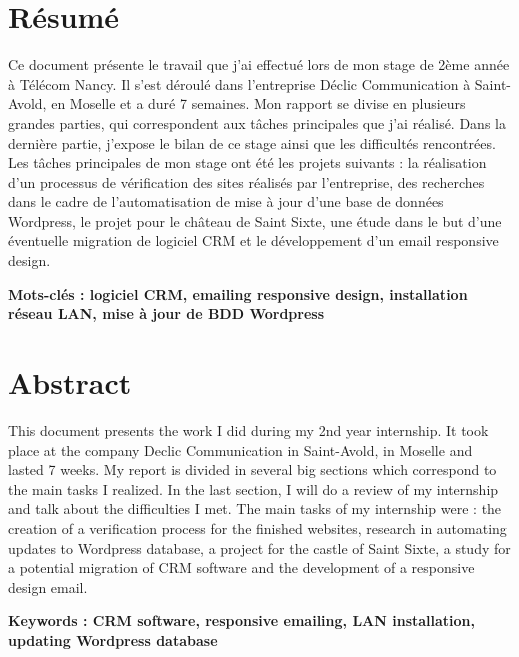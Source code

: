 \documentclass[report]{tnreport}
\begin{document}
\cleardoublepage
\thispagestyle{empty}

\section*{Résumé}
Ce document présente le travail que j’ai effectué lors de mon stage de 2ème année à Télécom Nancy. Il s’est déroulé dans l’entreprise Déclic Communication à Saint-Avold, en Moselle et a duré 7 semaines. Mon rapport se divise en plusieurs grandes parties, qui correspondent aux tâches principales que j’ai réalisé. Dans la dernière partie, j’expose le bilan de ce stage ainsi que les difficultés rencontrées.
Les tâches principales de mon stage ont été les projets suivants : la réalisation d’un processus de vérification des sites réalisés par l’entreprise, des recherches dans le cadre de l’automatisation de mise à jour d’une base de données Wordpress, le projet pour le château de Saint Sixte, une étude dans le but d’une éventuelle migration de logiciel CRM et le développement d’un email responsive design.


{\bf Mots-clés : logiciel CRM, emailing responsive design, installation réseau LAN, mise à jour de BDD Wordpress}


\section*{Abstract}
This document presents the work I did during my 2nd year internship. It took place at the company Declic Communication in Saint-Avold, in Moselle and lasted 7 weeks. My report is divided in several big sections which correspond to the main tasks I realized. In the last section, I will do a review of my internship and talk about the difficulties I met. The main tasks of my internship were : the creation of a verification process for the finished websites, research in automating updates to Wordpress database, a project for the castle of Saint Sixte, a study for a potential migration of CRM software and the development of a responsive design email.

{\bf Keywords : CRM software, responsive emailing, LAN installation, updating Wordpress database}
\end{document}
